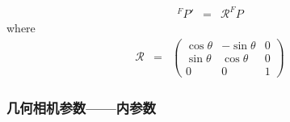 \documentclass{beamer}
\begin{document}
{{\begin{frame}
\end{frame}}{\begin{frame}
  \frametitle{}
  
  \
  
  
  \begin{eqnarray*}
    {}^F P' & = & \mathcal{R}^F P
  \end{eqnarray*}
  where
  \begin{eqnarray*}
    \mathcal{R} & = & \left(\begin{array}{ccc}
      \cos \theta & - \sin \theta & 0\\
      \sin \theta & \cos \theta & 0\\
      0 & 0 & 1
    \end{array}\right)
  \end{eqnarray*}
\end{frame}}{\begin{frame}
  \frametitle{几何相机参数------内参数}
  

\end{frame}}}
\end{document}
